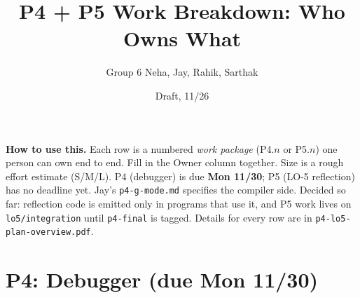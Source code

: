 \documentclass[10pt]{article}
\title{\vspace{-1.4em}\textbf{P4 + P5 Work Breakdown: Who Owns What}\vspace{-0.5em}}
\author{Group 6 \quad Neha, Jay, Rahik, Sarthak}
\date{Draft, 11/26}
\newcommand{\code}[1]{\texttt{\small #1}}
\begin{document}
\maketitle
\vspace{-2.2em}

\textbf{How to use this.} Each row is a numbered \emph{work package} (P4.$n$ or P5.$n$) one person can own end to end. Fill in the
Owner column together. Size is a rough effort estimate (S/M/L). P4 (debugger) is due
\textbf{Mon 11/30}; P5 (LO-5 reflection) has no deadline yet. Jay's \code{p4-g-mode.md} specifies the compiler side. Decided so far: reflection code is
emitted only in programs that use it, and P5 work lives on \code{lo5/integration} until
\code{p4-final} is tagged. Details for every row are in \code{p4-lo5-plan-overview.pdf}.

\section*{P4: Debugger (due Mon 11/30)}
\end{document}
